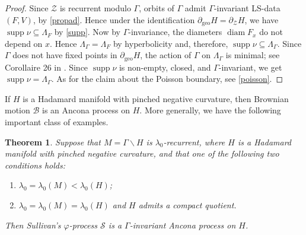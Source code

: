 \documentclass[12pt,a4paper]{amsart}
\numberwithin{equation}{section}
\newtheorem{thm}[equation]{Theorem}
\theoremstyle{definition}
\DeclareMathOperator{\diam}{diam}
\DeclareMathOperator{\geo}{geo}
\DeclareMathOperator{\supp}{supp}
\def\vf{\varphi}
\begin{document}
\begin{proof}
Since $\mathcal{Z}$ is recurrent modulo $\Gamma$, orbits of $\Gamma$ admit $\Gamma$-invariant LS-data $(F,V)$, by \cref{propad}.
Hence under the identification $\partial_{\geo}H=\partial_{\mathcal Z}H$, we have $\supp\nu\subseteq\Lambda_F$ by \cref{supp}.
Now by $\Gamma$-invariance, the diameters $\diam F_x$ do not depend on $x$.
Hence $\Lambda_\Gamma=\Lambda_F$ by hyperbolicity and, therefore, $\supp\nu\subseteq\Lambda_\Gamma$.
Since $\Gamma$ does not have fixed points in $\partial_{\geo}H$, the action of $\Gamma$ on $\Lambda_\Gamma$ is minimal; see Corollaire 26 in \cite[Chapter 8]{GH}.
Since $\supp\nu$ is non-empty, closed, and $\Gamma$-invariant, we get $\supp\nu=\Lambda_\Gamma$.
As for the claim about the Poisson boundary, see \cref{poisson}.
\end{proof}

If $H$ is a Hadamard manifold with pinched negative  curvature, then Brownian motion $\mathcal B$ is an Ancona process on $H$.
More generally, we have the following important class of examples.

\begin{thm}\label{sullivan}
Suppose that $M=\Gamma\backslash H$ is $\lambda_0$-recurrent, where $H$ is a Hada\-mard manifold with pinched negative  curvature, and that one of the following two conditions holds:
\begin{enumerate}
\item\label{less0} $\lambda_0=\lambda_0(M)<\lambda_0(H)$;
\item\label{less2} $\lambda_0=\lambda_0(M)=\lambda_0(H)$ and $H$ admits a compact quotient.
\end{enumerate}
Then Sullivan's $\vf$-process $\mathcal S$ is a $\Gamma$-invariant Ancona process on $H$.
\end{thm}
\end{document}
